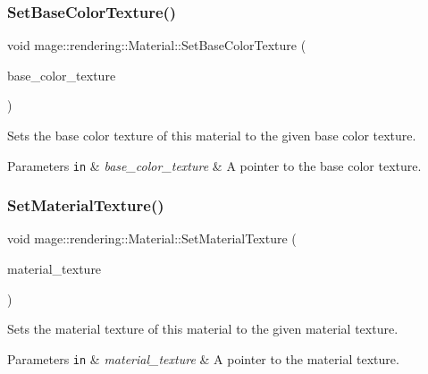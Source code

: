 \subsubsection{\texorpdfstring{Set\+Base\+Color\+Texture()}{SetBaseColorTexture()}}
{\footnotesize\ttfamily void mage\+::rendering\+::\+Material\+::\+Set\+Base\+Color\+Texture (\begin{DoxyParamCaption}\item[{\hyperlink{namespacemage_1_1rendering_a6f3ae54f825328465b0cdde0f0de4a36}{Texture\+Ptr}}]{base\+\_\+color\+\_\+texture }\end{DoxyParamCaption})\hspace{0.3cm}{\ttfamily [noexcept]}}

Sets the base color texture of this material to the given base color texture.


\begin{DoxyParams}[1]{Parameters}
\mbox{\tt in}  & {\em base\+\_\+color\+\_\+texture} & A pointer to the base color texture. \\
\hline
\end{DoxyParams}
\hypertarget{classmage_1_1rendering_1_1_material_a6bf886a16cbe84c55664701ab3a82658}{}\label{classmage_1_1rendering_1_1_material_a6bf886a16cbe84c55664701ab3a82658} 
\subsubsection{\texorpdfstring{Set\+Material\+Texture()}{SetMaterialTexture()}}
{\footnotesize\ttfamily void mage\+::rendering\+::\+Material\+::\+Set\+Material\+Texture (\begin{DoxyParamCaption}\item[{\hyperlink{namespacemage_1_1rendering_a6f3ae54f825328465b0cdde0f0de4a36}{Texture\+Ptr}}]{material\+\_\+texture }\end{DoxyParamCaption})\hspace{0.3cm}{\ttfamily [noexcept]}}

Sets the material texture of this material to the given material texture.


\begin{DoxyParams}[1]{Parameters}
\mbox{\tt in}  & {\em material\+\_\+texture} & A pointer to the material texture. \\
\hline
\end{DoxyParams}
\hypertarget{classmage_1_1rendering_1_1_material_a46b3297fb948c4fec3447caa35f96918}{}\label{classmage_1_1rendering_1_1_material_a46b3297fb948c4fec3447caa35f96918} 
